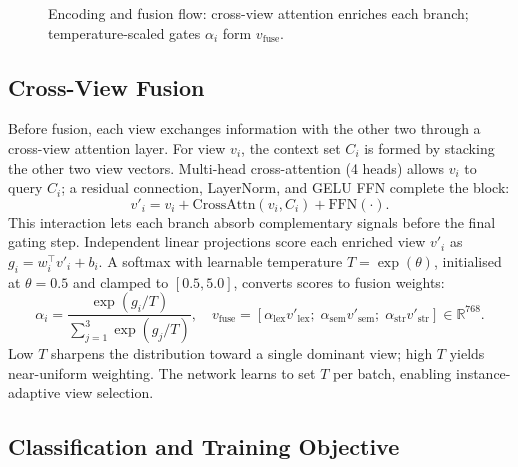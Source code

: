 \documentclass[10pt,twocolumn,a4paper]{article}
\begin{document}
\begin{figure}[!t]
\centering

\caption{Encoding and fusion flow: cross-view attention enriches each branch; temperature-scaled gates $\alpha_i$ form $v_{\mathrm{fuse}}$.}
\label{fig:branches_fusion}
\end{figure}

\subsection{Cross-View Fusion}\label{subsec:crossview}

Before fusion, each view exchanges information with the other two through a cross-view attention layer. For view $v_i$, the context set $C_i$ is formed by stacking the other two view vectors. Multi-head cross-attention (4 heads) allows $v_i$ to query $C_i$; a residual connection, LayerNorm, and GELU FFN complete the block:
\[
v'_i = v_i + \mathrm{CrossAttn}(v_i, C_i) + \mathrm{FFN}(\cdot).
\]
This interaction lets each branch absorb complementary signals before the final gating step. Independent linear projections score each enriched view $v'_i$ as $g_i = w_i^\top v'_i + b_i$. A softmax with learnable temperature $T{=}\exp(\theta)$, initialised at $\theta{=}0.5$ and clamped to $[0.5, 5.0]$, converts scores to fusion weights:
\begin{equation}
\alpha_i = \frac{\exp(g_i / T)}{\sum_{j=1}^{3} \exp(g_j / T)}, \quad
v_{\mathrm{fuse}} = [\alpha_{\mathrm{lex}} v'_{\mathrm{lex}};\; \alpha_{\mathrm{sem}} v'_{\mathrm{sem}};\; \alpha_{\mathrm{str}} v'_{\mathrm{str}}] \in \mathbb{R}^{768}.
\end{equation}
Low $T$ sharpens the distribution toward a single dominant view; high $T$ yields near-uniform weighting. The network learns to set $T$ per batch, enabling instance-adaptive view selection.

\subsection{Classification and Training Objective}\label{subsec:training_obj}
\end{document}
